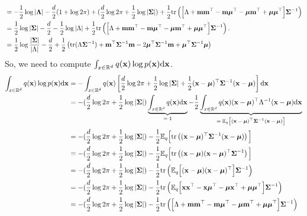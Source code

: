 \documentclass[12pt, fullpage,letterpaper]{article}
\begin{document}
\begin{enumerate}
{\begin{align*}
& = - \frac{1}{2}\log |\mathbf{\Lambda}| - \frac{d}{2}(1 + \log 2\pi) +
(\frac{d}{2}\log 2\pi +\frac12\log|\boldsymbol{\Sigma}|) +\frac12{\rm tr}\left( \Big[\Lambda +{\bf m}{\bf m}^\top -{\bf m}\boldsymbol{\mu}^\top  - \boldsymbol{\mu}{\bf m}^\top + \boldsymbol{\mu}\boldsymbol{\mu}^\top\Big]\boldsymbol{\Sigma}^{-1}\right)\\
& = \frac{1}{2}\log |\boldsymbol{\Sigma}| - \frac{d}{2} - \frac12\log|\Lambda| +\frac12{\rm tr}\left( \Big[\Lambda +{\bf m}{\bf m}^\top -{\bf m}\boldsymbol{\mu}^\top  - \boldsymbol{\mu}{\bf m}^\top + \boldsymbol{\mu}\boldsymbol{\mu}^\top\Big]\boldsymbol{\Sigma}^{-1}\right).\\
& = \frac{1}{2}\log \frac{|\boldsymbol{\Sigma}|}{|\Lambda|} - \frac{d}{2}  +
\frac12\left({\rm tr}(\Lambda\boldsymbol{\Sigma}^{-1}) + {\bf m}^\top\boldsymbol{\Sigma}^{-1}{\bf m} - 2\boldsymbol{\mu}^\top\boldsymbol{\Sigma}^{-1}{\bf m}  +  \boldsymbol{\mu}^\top\boldsymbol{\Sigma}^{-1} \boldsymbol{\mu}\right)
\end{align*}
So, we need to compute  $\int_{x\in\mathbb{R}^d} q({\bf x})\log p({\bf x}) {\rm d}{\bf x}$. 
\begin{align*}
\int_{x\in \mathbb{R}^d} q({\bf x})\log p({\bf x}) {\rm d} {\bf x} 
& = -\int_{x\in \mathbb{R}^d} q({\bf x})\left[\frac{d}{2}\log 2\pi +\frac12\log|\boldsymbol{\Sigma}| +\frac{1}{2}({\bf x}-\boldsymbol{\mu})^\top\boldsymbol{\Sigma}^{-1}({\bf x}-\boldsymbol{\mu})\right] {\rm d} {\bf x} \\
& = -(\frac{d}{2}\log 2\pi +\frac12\log|\boldsymbol{\Sigma}|)\underbrace{\int_{x\in \mathbb{R}^d} q({\bf x}){\rm d}{\bf x}}_\text{$=1$} -\frac{1}{2}\underbrace{\int_{x\in \mathbb{R}^d} q({\bf x})({\bf x}-\boldsymbol{\mu})^\top\Lambda^{-1}({\bf x}-\boldsymbol{\mu}){\rm d} {\bf x}}_\text{$=\mathbb{E}_q\Big[({\bf x}-\boldsymbol{\mu})^\top\boldsymbol{\Sigma}^{-1}({\bf x}-\boldsymbol{\mu})\Big]$}  \\
& = -(\frac{d}{2}\log 2\pi +\frac12\log|\boldsymbol{\Sigma}|) -\frac12 \mathbb{E}_q\Big[{\rm tr}\left(({\bf x}-\boldsymbol{\mu})^\top\boldsymbol{\Sigma}^{-1}({\bf x}-\boldsymbol{\mu})\right)\Big]\\
& = -(\frac{d}{2}\log 2\pi +\frac12\log|\boldsymbol{\Sigma}|) -\frac12 \mathbb{E}_q\Big[{\rm tr}\left(({\bf x}-\boldsymbol{\mu})({\bf x}-\boldsymbol{\mu})^\top\boldsymbol{\Sigma}^{-1}\right)\Big]\\
& = -(\frac{d}{2}\log 2\pi +\frac12\log|\boldsymbol{\Sigma}|) -\frac12{\rm tr}\left( \mathbb{E}_q\Big[({\bf x}-\boldsymbol{\mu})({\bf x}-\boldsymbol{\mu})^\top\Big]\boldsymbol{\Sigma}^{-1}\right)\\
& = -(\frac{d}{2}\log 2\pi +\frac12\log|\boldsymbol{\Sigma}|) -\frac12{\rm tr}\left( \mathbb{E}_q\Big[{\bf x}{\bf x}^\top - {\bf x}\boldsymbol{\mu}^\top-\boldsymbol{\mu}{\bf x}^\top +\boldsymbol{\mu}\boldsymbol{\mu}^\top\Big]\boldsymbol{\Sigma}^{-1}\right)\\
& = -(\frac{d}{2}\log 2\pi +\frac12\log|\boldsymbol{\Sigma}|) -\frac12{\rm tr}\left( \Big[\Lambda +{\bf m}{\bf m}^\top -{\bf m}\boldsymbol{\mu}^\top  - \boldsymbol{\mu}{\bf m}^\top + \boldsymbol{\mu}\boldsymbol{\mu}^\top\Big]\boldsymbol{\Sigma}^{-1}\right)
\end{align*}
}


\end{enumerate}
\end{document}
